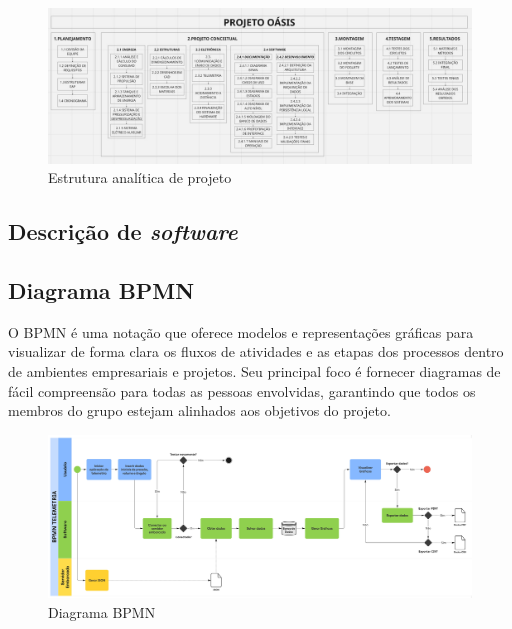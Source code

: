 \begin{landscape}

\begin{figure}
    \centering
    \includegraphics[width=1\linewidth]{editaveis/figuras/EAP_ProjetoOasis.jpeg}
    \caption{Estrutura analítica de projeto}
    \label{fig:enter-label}
\end{figure}

\end{landscape}


\begin{landscape}
\section{Descrição de \textit{software}}
\subsection{Diagrama BPMN}

O BPMN é uma notação que oferece modelos e representações gráficas para visualizar de forma clara os fluxos de atividades e as etapas dos processos dentro de ambientes empresariais e projetos. Seu principal foco é fornecer diagramas de fácil compreensão para todas as pessoas envolvidas, garantindo que todos os membros do grupo estejam alinhados aos objetivos do projeto.

\begin{figure}[H]
    \centering
    \includegraphics[width=1\linewidth]{editaveis/figuras/bpmn.jpg}
    \caption{Diagrama BPMN}
    \label{fig:enter-label}
\end{figure}
\end{landscape}

